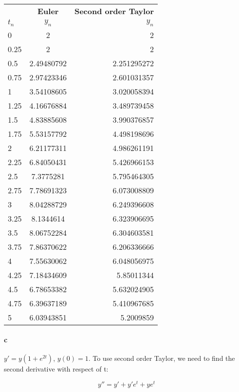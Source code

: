 \documentclass{article}
\begin{document}
\begin{table}[ht]
  \begin{center}
    \label{tab:table 2.b}
    \begin{tabular}{|l|c|r|} %
    \hline
     &\textbf{Euler}&\textbf{Second order Taylor}\\
    $t_n$&$y_n$&$y_n$\\
    \hline
    0&2&2\\
    0.25&2&2\\
    0.5&2.49480792&2.251295272\\
    0.75&2.97423346&2.601031357\\
    1&3.54108605&3.020058394\\
    1.25&4.16676884&3.489739458\\
    1.5&4.83885608&3.990376857\\
    1.75&5.53157792&4.498198696\\
    2&6.21177311&4.986261191\\
    2.25&6.84050431&5.426966153\\
    2.5&7.3775281&5.795464305\\
    2.75&7.78691323&6.073008809\\
    3&8.04288729&6.249396608\\
    3.25&8.1344614&6.323906695\\
    3.5&8.06752284&6.304603581\\
    3.75&7.86370622&6.206336666\\
    4&7.55630062&6.048056975\\
    4.25&7.18434609&5.85011344\\
    4.5&6.78653382&5.632024905\\
    4.75&6.39637189&5.410967685\\
    5&6.03943851&5.2009859\\
    \hline
    \end{tabular}
  \end{center}
\end{table}

\newpage

\paragraph{c} $y' = y(1+e^{2t})$, $y(0)=1$. To use second order Taylor, we need to find the
second derivative with respect of t:

\[
    y'' =  y' + y'e^{t} + ye^{t}
\]
\end{document}
